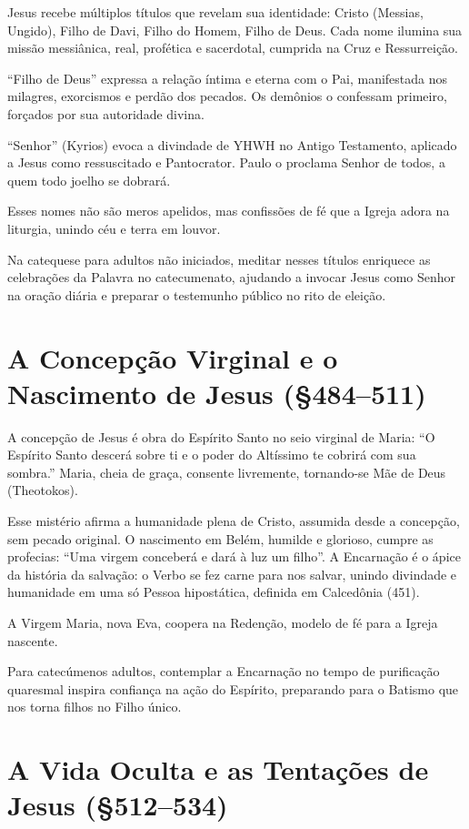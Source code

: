 Jesus recebe múltiplos títulos que revelam sua identidade: Cristo (Messias, Ungido), Filho de Davi, Filho do Homem, Filho de Deus. Cada nome ilumina sua missão messiânica, real, profética e sacerdotal, cumprida na Cruz e Ressurreição.

``Filho de Deus'' expressa a relação íntima e eterna com o Pai, manifestada nos milagres, exorcismos e perdão dos pecados. Os demônios o confessam primeiro, forçados por sua autoridade divina.

``Senhor'' (Kyrios) evoca a divindade de YHWH no Antigo Testamento, aplicado a Jesus como ressuscitado e Pantocrator. Paulo o proclama Senhor de todos, a quem todo joelho se dobrará.

Esses nomes não são meros apelidos, mas confissões de fé que a Igreja adora na liturgia, unindo céu e terra em louvor.

Na catequese para adultos não iniciados, meditar nesses títulos enriquece as celebrações da Palavra no catecumenato, ajudando a invocar Jesus como Senhor na oração diária e preparar o testemunho público no rito de eleição.

\section{A Concepção Virginal e o Nascimento de Jesus (\S 484--511)}

A concepção de Jesus é obra do Espírito Santo no seio virginal de Maria: ``O Espírito Santo descerá sobre ti e o poder do Altíssimo te cobrirá com sua sombra.'' Maria, cheia de graça, consente livremente, tornando-se Mãe de Deus (Theotokos).

Esse mistério afirma a humanidade plena de Cristo, assumida desde a concepção, sem pecado original. O nascimento em Belém, humilde e glorioso, cumpre as profecias: ``Uma virgem conceberá e dará à luz um filho''.
A Encarnação é o ápice da história da salvação: o Verbo se fez carne para nos salvar, unindo divindade e humanidade em uma só Pessoa hipostática, definida em Calcedônia (451).

A Virgem Maria, nova Eva, coopera na Redenção, modelo de fé para a Igreja nascente.

Para catecúmenos adultos, contemplar a Encarnação no tempo de purificação quaresmal inspira confiança na ação do Espírito, preparando para o Batismo que nos torna filhos no Filho único.

\section{A Vida Oculta e as Tentações de Jesus (\S 512--534)}

